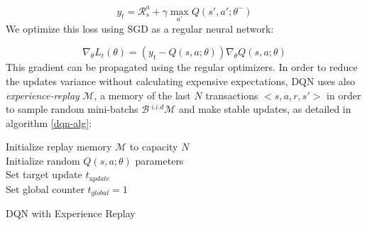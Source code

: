\documentclass[10pt,a4paper,draft]{article}
\begin{document}
\begin{equation}
y_t = \mathcal{R}_s^a + \gamma\max_{a'}Q(s',a';\theta^-)
\label{dqn_target}
\end{equation}
We optimize this loss using SGD as a regular neural network:

\begin{equation}
\nabla_{\theta} L_t(\theta) = (y_t - Q(s,a;\theta))\nabla_{\theta}Q(s,a;\theta)
\end{equation}
This gradient can be propagated using the regular optimizers. In order to reduce the updates variance without calculating expensive expectations, DQN uses also \textit{experience-replay} $\mathcal{M}$, a memory of the last $N$ transactions $<s,a,r,s'>$ in order to sample random mini-batchs $\mathcal{B} ~^{i.i.d} \mathcal{M}$ and make stable updates, as detailed in algorithm \ref{dqn-alg}:

\begin{algorithm}[H]
	\SetAlgoLined
	\DontPrintSemicolon
	\KwResult{$\theta$}
 	Initialize replay memory $\mathcal{M}$ to capacity $N$ \\
	Initialize random $Q(s,a;\theta)$ parameters \\
	Set target update $t_{update}$ \\ 
	Set global counter $t_{global} = 1$ \\
	\caption{DQN with Experience Replay}
 	\label{dqn-alg}
\end{algorithm}
\end{document}
